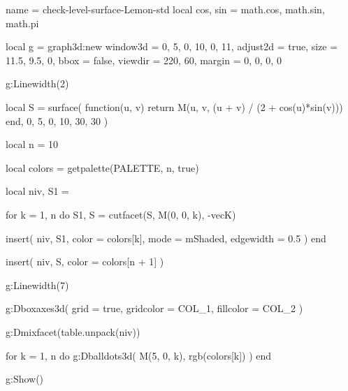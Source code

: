 \documentclass{tutodoc}
\newcommand{\PALETTE}{Lemon}
\begin{document}
\vfill

\begin{luadraw}{name = check-level-surface-\PALETTE-std}
local cos, sin = math.cos, math.sin, math.pi

local g = graph3d:new{
  window3d = {0, 5, 0, 10, 0, 11},
  adjust2d = true,
  size     = {11.5, 9.5, 0},
  bbox     = false,
  viewdir  = {220, 60},
  margin   = {0, 0, 0, 0}
}

g:Linewidth(2)

local S = surface(
  function(u, v)
    return M(u, v, (u + v) / (2 + cos(u)*sin(v)))
  end,
  0, 5, 0, 10,
  {30, 30}
)

local n = 10

local colors = getpalette(PALETTE, n, true)

local niv, S1 = {}

for k = 1, n do
  S1, S = cutfacet(S, {M(0, 0, k), -vecK})

  insert(
    niv,
    {
      S1,
      {
        color     = colors[k],
        mode      = mShaded,
        edgewidth = 0.5
      }
    }
  )
end

insert(
  niv,
  {
    S,
    {color = colors[n + 1]}
  }
)

g:Linewidth(7)

g:Dboxaxes3d({
  grid      = true,
  gridcolor = COL_1,
  fillcolor = COL_2
})

g:Dmixfacet(table.unpack(niv))

for k = 1, n do
  g:Dballdots3d(
    M(5, 0, k),
    rgb(colors[k])
  )
end

g:Show()
\end{luadraw}
\end{document}
